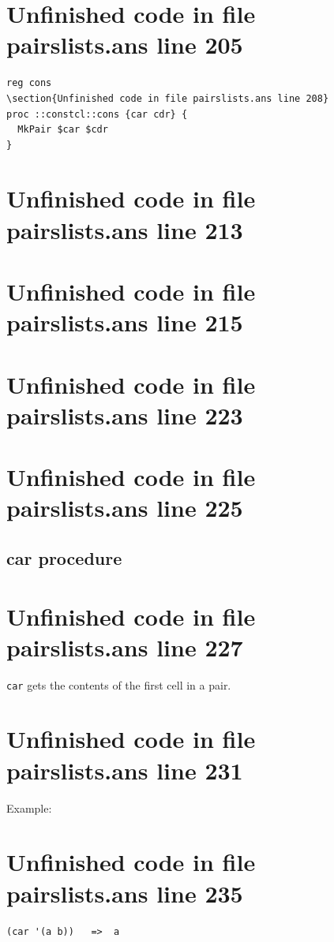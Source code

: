 \documentclass[twoside,9pt]{report}
\begin{document}
\section{Unfinished code in file pairslists.ans line 205}
\begin{lstlisting}
reg cons
\section{Unfinished code in file pairslists.ans line 208}
proc ::constcl::cons {car cdr} {
  MkPair $car $cdr
}
\end{lstlisting}
\section{Unfinished code in file pairslists.ans line 213}
\section{Unfinished code in file pairslists.ans line 215}
\section{Unfinished code in file pairslists.ans line 223}
\section{Unfinished code in file pairslists.ans line 225}
\subsection{car procedure}
\label{car-procedure}
\section{Unfinished code in file pairslists.ans line 227}


\texttt{car} gets the contents of the first cell in a pair.

\section{Unfinished code in file pairslists.ans line 231}


Example:

\section{Unfinished code in file pairslists.ans line 235}
\begin{verbatim}
(car '(a b))   =>  a
\end{verbatim}
\end{document}
